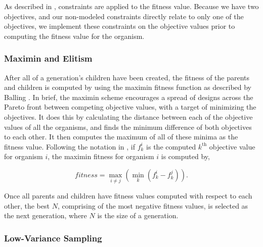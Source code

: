 \documentclass[letterpaper, 10 pt, conference]{ieeeconf}  %
\begin{document}
As described in \cite{Parkinson2019}, constraints are applied to the fitness value. Because we have two objectives, and our non-modeled constraints directly relate to only one of the objectives, we implement these constraints on the objective values prior to computing the fitness value for the organism.

\subsubsection{Maximin and Elitism}\label{maximin}

After all of a generation's children have been created, the fitness of the parents and children is computed by using the maximin fitness function as described by Balling \cite{Balling2003}. In brief, the maximin scheme encourages a spread of designs across the Pareto front between competing objective values, with a target of minimizing the objectives. It does this by calculating the distance between each of the objective values of all the organisms, and finds the minimum difference of both objectives to each other. It then computes the maximum of all of these minima as the fitness value. Following the notation in \cite{Parkinson2019}, if $f_k^i$ is the computed $k^{\mathrm{th}}$ objective value for organism $i$, the maximin fitness for organism $i$ is computed by,

\begin{equation}%
    \mathit{fitness} = \max_{i \neq j}\left(\min_{k}\left(f_k^i - f_k^j\right)\right).
\end{equation}

Once all parents and children have fitness values computed with respect to each other, the best $N$, comprising of the most negative fitness values, is selected as the next generation, where $N$ is the size of a generation.

\subsubsection{Low-Variance Sampling}
\end{document}
